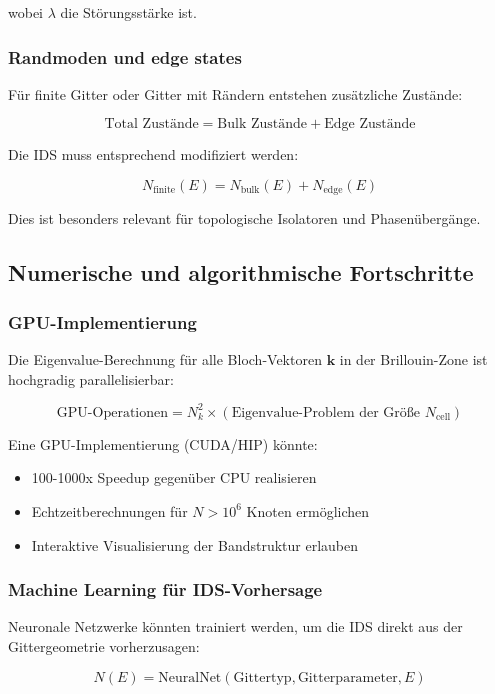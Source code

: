\documentclass[a4paper,12pt]{article}
\theoremstyle{definition}
\begin{document}
wobei $\lambda$ die Störungsstärke ist.

\subsubsection{Randmoden und edge states}

Für finite Gitter oder Gitter mit Rändern entstehen zusätzliche Zustände:

\[
\text{Total Zustände} = \text{Bulk Zustände} + \text{Edge Zustände}
\]

Die IDS muss entsprechend modifiziert werden:

\[
N_{\text{finite}}(E) = N_{\text{bulk}}(E) + N_{\text{edge}}(E)
\]

Dies ist besonders relevant für topologische Isolatoren und Phasenübergänge.

\subsection{Numerische und algorithmische Fortschritte}

\subsubsection{GPU-Implementierung}

Die Eigenvalue-Berechnung für alle Bloch-Vektoren $\mathbf{k}$ in der Brillouin-Zone ist hochgradig parallelisierbar:

\[
\text{GPU-Operationen} = N_k^2 \times (\text{Eigenvalue-Problem der Größe } N_{\text{cell}})
\]

Eine GPU-Implementierung (CUDA/HIP) könnte:
\begin{itemize}
	\item 100-1000x Speedup gegenüber CPU realisieren
	\item Echtzeitberechnungen für $N > 10^6$ Knoten ermöglichen
	\item Interaktive Visualisierung der Bandstruktur erlauben
\end{itemize}

\subsubsection{Machine Learning für IDS-Vorhersage}

Neuronale Netzwerke könnten trainiert werden, um die IDS direkt aus der Gittergeometrie vorherzusagen:

\[
N(E) = \text{NeuralNet}(\text{Gittertyp}, \text{Gitterparameter}, E)
\]
\end{document}
